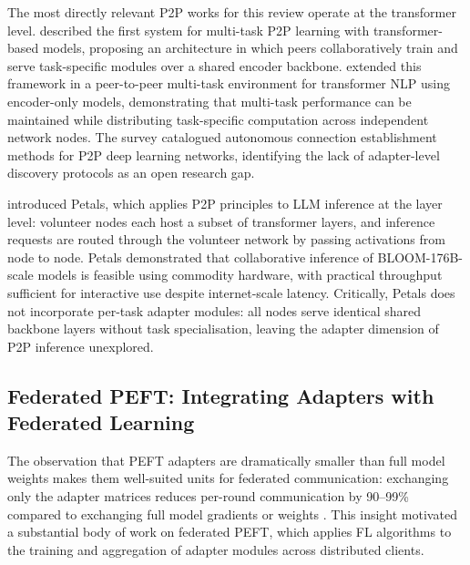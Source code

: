 The most directly relevant P2P works for this review operate at the transformer level.
\citet{Sajina2021} described the first system for multi-task P2P learning with
transformer-based models, proposing an architecture in which peers collaboratively
train and serve task-specific modules over a shared encoder backbone. \citet{Sajina2024}
extended this framework in a peer-to-peer multi-task environment for transformer NLP
using encoder-only models, demonstrating that multi-task performance can be maintained
while distributing task-specific computation across independent network nodes. The
\citet{SajinaP2PConnection2024} survey catalogued autonomous connection establishment
methods for P2P deep learning networks, identifying the lack of adapter-level discovery
protocols as an open research gap.

\citet{Borzunov2023} introduced Petals, which applies P2P principles to LLM inference
at the layer level: volunteer nodes each host a subset of transformer layers, and
inference requests are routed through the volunteer network by passing activations
from node to node. Petals demonstrated that collaborative inference of BLOOM-176B-scale
models is feasible using commodity hardware, with practical throughput sufficient for
interactive use despite internet-scale latency. Critically, Petals does not incorporate
per-task adapter modules: all nodes serve identical shared backbone layers without task
specialisation, leaving the adapter dimension of P2P inference unexplored.

\subsection{Federated PEFT: Integrating Adapters with Federated Learning}
\label{sec:p2p_federated:fed_peft}

The observation that PEFT adapters are dramatically smaller than full model weights
makes them well-suited units for federated communication: exchanging only the adapter
matrices reduces per-round communication by 90--99\% compared to exchanging full model
gradients or weights \citep{ZhangFedPETuning2023}. This insight motivated a substantial
body of work on federated PEFT, which applies FL algorithms to the training and
aggregation of adapter modules across distributed clients.

